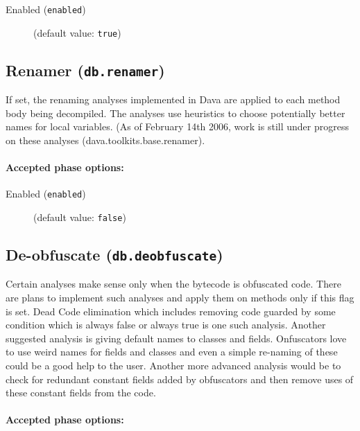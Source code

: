 \documentclass{article}
\begin{document}
\begin{description}

\item[Enabled ({\tt enabled})]
(default value: {\tt true})






\end{description}

\subsection{Renamer ({\tt db.renamer})}
If set, the renaming analyses implemented in Dava are applied to each method body being decompiled. The analyses use heuristics to choose potentially better names for local variables. (As of February 14th 2006, work is still under progress on these analyses (dava.toolkits.base.renamer).
					

\paragraph{Accepted phase options:} 

\begin{description}

\item[Enabled ({\tt enabled})]
(default value: {\tt false})






\end{description}

\subsection{De-obfuscate ({\tt db.deobfuscate})}
Certain analyses make sense only when the bytecode is obfuscated code. 
There are plans to implement such analyses and apply them on methods only if this flag is set. 
Dead Code elimination which includes removing code guarded by some condition which is always false or always true is one such
analysis. Another suggested analysis is giving default names to classes and fields. Onfuscators love to use weird names
for fields and classes and even a simple re-naming of these could be a good help to the user. 
Another more advanced analysis would be to check for redundant constant fields added by obfuscators and then remove uses 
of these constant fields from the code.

\paragraph{Accepted phase options:} 
\end{document}
